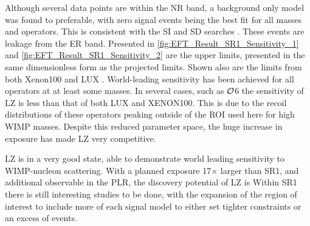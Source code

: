 


\par
Although several data points are within the NR band, a background only model was found to preferable, with zero signal events being the best fit for all masses and operators.
This is consistent with the SI and SD searches \cite{lz_ws_sr1_ref}.
These events are leakage from the ER band.
Presented in \autoref{fig:EFT_Result_SR1_Sensitivity_1} and \autoref{fig:EFT_Result_SR1_Sensitivity_2} are the upper limits, presented in the same dimensionless form as the projected limits.
Shown also are the limits from both Xenon100 \cite{xenon100_eft_ref} and LUX \cite{LUX_RUN4_EFT_2021}.
World-leading sensitivity has been achieved for all operators at at least some masses.
In several cases, such as $\operatorname{\mathcal{O}}$6 the sensitivity of LZ is less than that of both LUX and XENON100. 
This is due to the recoil distributions of these operators peaking outside of the ROI used here for high WIMP masses.
Despite this reduced parameter space, the huge increase in exposure has made LZ very competitive.


\par
LZ is in a very good state, able to demonstrate world leading sensitivity to WIMP-nucleon scattering.
With a planned exposure 17$\times$ larger than SR1, and additional observable in the PLR, the discovery potential of LZ is 
Within SR1 there is still interesting studies to be done, with the expansion of the region of interest to include more of each signal model to either set tighter constraints or an excess of events.

